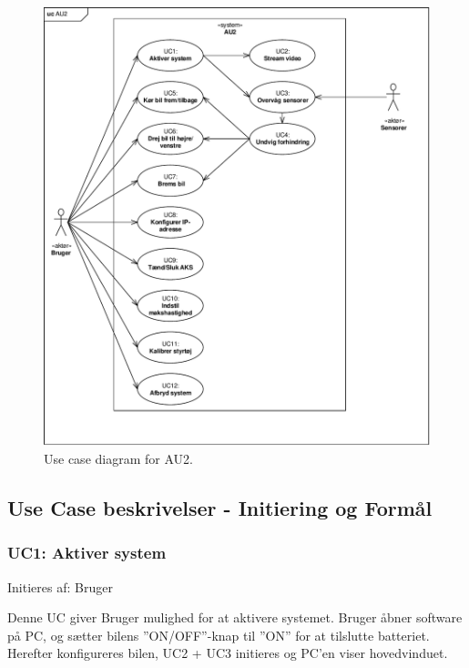 \begin{figure}[h]
\centering
\includegraphics[width=\textwidth - 1 cm]{../fig/diagrammer/uc_au2.pdf}
\caption{Use case diagram for AU2.}
\label{fig:UC_au2}
\end{figure}
\clearpage


\subsection{Use Case beskrivelser - Initiering og Formål} 
\subsubsection{UC1: Aktiver system}
Initieres af: Bruger

Denne UC giver Bruger mulighed for at aktivere systemet. Bruger åbner software på PC, og sætter bilens ''ON/OFF''-knap til ''ON'' for at tilslutte batteriet. Herefter konfigureres bilen, UC2 + UC3 initieres og PC'en viser hovedvinduet. 

